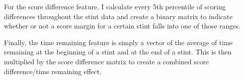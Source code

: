 \documentclass[]{article}
\newenvironment{Shaded}{\begin{snugshade}}{\end{snugshade}}
\newcommand{\KeywordTok}[1]{\textcolor[rgb]{0.13,0.29,0.53}{\textbf{#1}}}
\newcommand{\DecValTok}[1]{\textcolor[rgb]{0.00,0.00,0.81}{#1}}
\newcommand{\StringTok}[1]{\textcolor[rgb]{0.31,0.60,0.02}{#1}}
\newcommand{\OperatorTok}[1]{\textcolor[rgb]{0.81,0.36,0.00}{\textbf{#1}}}
\newcommand{\NormalTok}[1]{#1}
\begin{document}
For the score difference feature, I calculate every 5th percentile of
scoring differences throughout the stint data and create a binary matrix
to indicate whether or not a score margin for a certain stint falls into
one of those ranges.

Finally, the time remaining feature is simply a vector of the average of
time remaining at the beginning of a stint and at the end of a stint.
This is then multiplied by the score difference matrix to create a
combined score difference/time remaining effect.

\begin{Shaded}
\end{Shaded}
\end{document}

